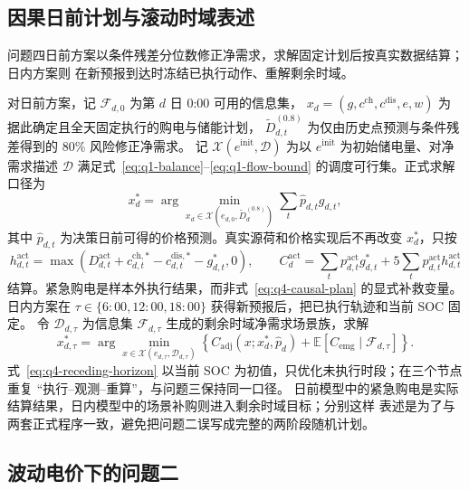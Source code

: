 \documentclass[withoutpreface,bwprint]{cumcmthesis}
\begin{document}
\subsection{因果日前计划与滚动时域表述}

问题四日前方案以条件残差分位数修正净需求，求解固定计划后按真实数据结算；日内方案则
在新预报到达时冻结已执行动作、重解剩余时域\cite{parisio2016,silvente2015}。

对日前方案，记 $\mathcal F_{d,0}$ 为第 $d$ 日 0:00 可用的信息集，
$x_d=(g,c^{\mathrm{ch}},c^{\mathrm{dis}},e,w)$ 为据此确定且全天固定执行的购电与储能计划，
$\widetilde D_{d,t}^{(0.8)}$ 为仅由历史点预测与条件残差得到的 80\% 风险修正净需求。
记 $\mathcal X(e^{\mathrm{init}},\mathcal D)$ 为以 $e^{\mathrm{init}}$ 为初始储电量、对净需求描述
$\mathcal D$ 满足式~\eqref{eq:q1-balance}--\eqref{eq:q1-flow-bound} 的调度可行集。正式求解口径为
\begin{equation}
  x_d^*=\arg\min_{x_d\in\mathcal X(e_{d,0},\widetilde D_d^{(0.8)})}
  \sum_t \widehat p_{d,t}g_{d,t},
  \label{eq:q4-causal-plan}
\end{equation}
其中 $\widehat p_{d,t}$ 为决策日前可得的价格预测。真实源荷和价格实现后不再改变
$x_d^*$，只按
\begin{equation}
  h_{d,t}^{\mathrm{act}}=\max\!\left(D_{d,t}^{\mathrm{act}}
  +c_{d,t}^{\mathrm{ch},*}-c_{d,t}^{\mathrm{dis},*}-g_{d,t}^*,0\right),
  \qquad
  C_d^{\mathrm{act}}=\sum_t p_{d,t}^{\mathrm{act}}g_{d,t}^*
  +5\sum_t p_{d,t}^{\mathrm{act}}h_{d,t}^{\mathrm{act}}
  \label{eq:q4-settlement}
\end{equation}
结算。紧急购电是样本外执行结果，而非式~\eqref{eq:q4-causal-plan} 的显式补救变量。日内方案在
$\tau\in\{6{:}00,12{:}00,18{:}00\}$ 获得新预报后，把已执行轨迹和当前 SOC 固定。
令 $\mathcal D_{d,\tau}$ 为信息集 $\mathcal F_{d,\tau}$ 生成的剩余时域净需求场景族，求解
\begin{equation}
 x^*_{d,\tau}=\arg\min_{x\in\mathcal X(e_{d,\tau},\mathcal D_{d,\tau})}
 \left\{C_{\mathrm{adj}}(x;x_d^*,\widehat p_d)
 +\mathbb E[C_{\mathrm{emg}}\mid\mathcal F_{d,\tau}]\right\}.
 \label{eq:q4-receding-horizon}
\end{equation}
式~\eqref{eq:q4-receding-horizon} 以当前 SOC 为初值，只优化未执行时段；在三个节点重复
“执行--观测--重算”，与问题三保持同一口径。
日前模型中的紧急购电是实际结算结果，日内模型中的场景补购则进入剩余时域目标；分别这样
表述是为了与两套正式程序一致，避免把问题二误写成完整的两阶段随机计划。

\subsection{波动电价下的问题二}
\end{document}
